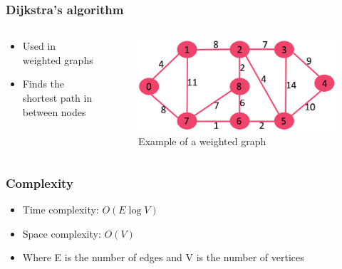 \documentclass[pdf,fyma2]{beamer}
\begin{document}
\begin{frame}
    \frametitle{Dijkstra's algorithm}

    \begin{columns}

    \begin{column}{0.5\textwidth}
        \begin{itemize}
            \item Used in weighted graphs
            \item Finds the shortest path in between nodes
        \end{itemize}
    \end{column}
    
    \begin{column}{0.5\textwidth}
        \begin{figure}
            \includegraphics[width=\textwidth]{img/dijsktra_graph.jpg}
            \caption{Example of a weighted graph}
        \end{figure}
    \end{column}
    
    \end{columns}
    
\end{frame}

\begin{frame}
    \frametitle{Complexity}
    \begin{itemize}
        \item Time complexity: $O(E \log V)$
        \pause
        \item Space complexity: $O(V)$
        \pause
        \item Where E is the number of edges and V is the number of vertices
    \end{itemize}
\end{frame}
\end{document}
